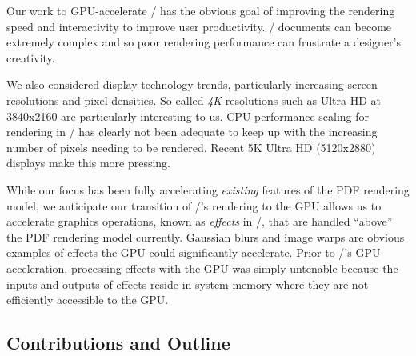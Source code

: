 Our work to GPU-accelerate \Illustrator/ has the obvious goal of improving
the rendering speed and interactivity to improve user productivity.  \Illustrator/
documents can become extremely complex and so poor rendering performance
can frustrate a designer's creativity.

We also considered display technology trends, particularly increasing screen resolutions and
pixel densities.  So-called {\em 4K} resolutions such as Ultra HD at 3840x2160
are particularly interesting to us.
CPU performance scaling for rendering in \Illustrator/ has clearly not
been adequate to keep up with the increasing number of pixels needing to be rendered.
Recent 5K Ultra HD (5120x2880) displays make this more pressing.


While our focus has been fully accelerating {\em existing} features of the PDF rendering model, we
anticipate our transition of \Illustrator/'s rendering to the GPU allows us to accelerate graphics
operations, known as {\em effects} in \Illustrator/, that are handled ``above'' the PDF rendering model currently.
Gaussian blurs and image warps are obvious examples of effects the GPU could significantly accelerate.
\ifdefined\NOSHOW
Prior to \Illustrator/'s GPU-acceleration, processing effects with the
GPU was simply untenable because the inputs and outputs of effects reside in system
memory where they are not efficiently accessible to the GPU.
\fi


\subsection{Contributions and Outline}
\label{sec:contributions}

